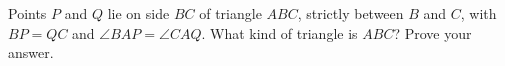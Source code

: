 Points $P$ and $Q$ lie on side $BC$ of triangle $ABC$, strictly between $B$ and $C$, with $BP=QC$ and $\angle BAP=\angle CAQ$. What kind of triangle is $ABC$? Prove your answer.
